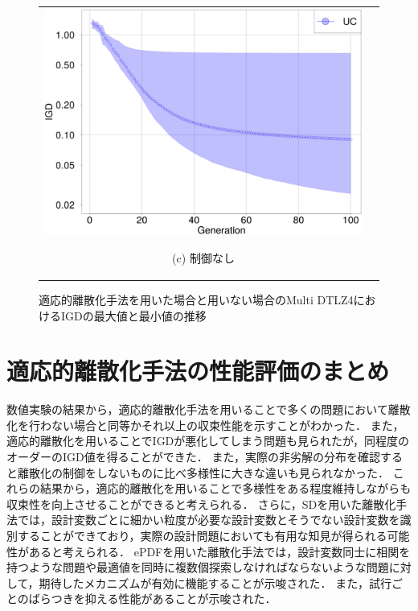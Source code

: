 \documentclass[../main/main]{subfiles}
\begin{document}
\begin{figure}[htbp]
\begin{tabular}{cc}
\begin{minipage}{0.33\hsize}
\includegraphics[width=1\linewidth]{../figures/multidtlz4_uc_minmax.png}
\begin{center}
{\footnotesize (c) 制御なし}
\end{center}
\end{minipage}
\end{tabular}
\caption{適応的離散化手法を用いた場合と用いない場合のMulti DTLZ4におけるIGDの最大値と最小値の推移}
\label{fig:minmax}
\end{figure}

\section{適応的離散化手法の性能評価のまとめ}
\quad 数値実験の結果から，適応的離散化手法を用いることで多くの問題において離散化を行わない場合と同等かそれ以上の収束性能を示すことがわかった．
また，適応的離散化を用いることでIGDが悪化してしまう問題も見られたが，同程度のオーダーのIGD値を得ることができた．
また，実際の非劣解の分布を確認すると離散化の制御をしないものに比べ多様性に大きな違いも見られなかった．
これらの結果から，適応的離散化を用いることで多様性をある程度維持しながらも収束性を向上させることができると考えられる．
さらに，SDを用いた離散化手法では，設計変数ごとに細かい粒度が必要な設計変数とそうでない設計変数を識別することができており，実際の設計問題においても有用な知見が得られる可能性があると考えられる．
ePDFを用いた離散化手法では，設計変数同士に相関を持つような問題や最適値を同時に複数個探索しなければならないような問題に対して，期待したメカニズムが有効に機能することが示唆された．
また，試行ごとのばらつきを抑える性能があることが示唆された．
\end{document}
